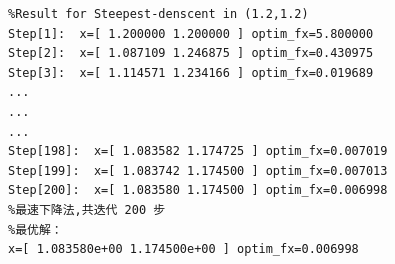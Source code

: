 \begin{lstlisting}
%Result for Steepest-denscent in (1.2,1.2)
Step[1]:  x=[ 1.200000 1.200000 ] optim_fx=5.800000
Step[2]:  x=[ 1.087109 1.246875 ] optim_fx=0.430975
Step[3]:  x=[ 1.114571 1.234166 ] optim_fx=0.019689
...
...
...
Step[198]:  x=[ 1.083582 1.174725 ] optim_fx=0.007019
Step[199]:  x=[ 1.083742 1.174500 ] optim_fx=0.007013
Step[200]:  x=[ 1.083580 1.174500 ] optim_fx=0.006998
%最速下降法,共迭代 200 步
%最优解：
x=[ 1.083580e+00 1.174500e+00 ] optim_fx=0.006998
\end{lstlisting}

\begin{figure}[H]
\centering
{}

\end{figure}
